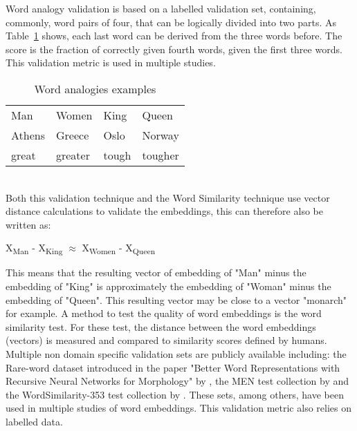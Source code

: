 \documentclass[../../Thesis.tex]{subfiles}
\begin{document}
\begin{jumpin}
Word analogy validation is based on a labelled validation set, containing, commonly, word pairs of four, that can be logically divided into two parts. As Table~\ref{table:wordAnalogies} shows, each last word can be derived from the three words before. The score is the fraction of correctly given fourth words, given the first three words. This validation metric is used in multiple studies\cite{mikolov2013distributed, mikolov2013efficient, dai2015document, pennington2014glove}.\\
\begin{table}[hbt]
\begin{center}
\begin{tabular}{l l l l}
Man & Women & King & Queen \\
Athens & Greece & Oslo & Norway\\
great & greater & tough & tougher
\end{tabular}
\end{center}
\caption{Word analogies examples}\label{table:wordAnalogies}
\end{table}\\
Both this validation technique and the Word Similarity technique use vector distance calculations to validate the embeddings, this can therefore also be written as:
\begin{displayquote}
	X\textsubscript{Man} - X\textsubscript{King} $\approx$  X\textsubscript{Women} - X\textsubscript{Queen}
\end{displayquote}
This means that the resulting vector of embedding of "Man" minus the embedding of "King" is approximately the embedding of "Woman" minus the embedding of "Queen". This resulting vector may be close to a vector "monarch" for example.
A method to test the quality of word embeddings is the word similarity test. For these test, the distance between the word embeddings (vectors) is measured and compared to similarity scores defined by humans. Multiple non domain specific validation sets are publicly available including: the Rare-word dataset introduced in the paper "Better Word Representations with Recursive Neural Networks for Morphology" by \citet{luong2013better}, 
the MEN test collection by \citet{EBruniMENCollection} and the WordSimilarity-353 test collection by \citet{EGabrilovichWScollection}.
These sets, among others, have been used in multiple studies of word embeddings\cite{pennington2014glove, mikolov2013efficient}. This validation metric also relies on labelled data.

\end{jumpin}
\end{document}
